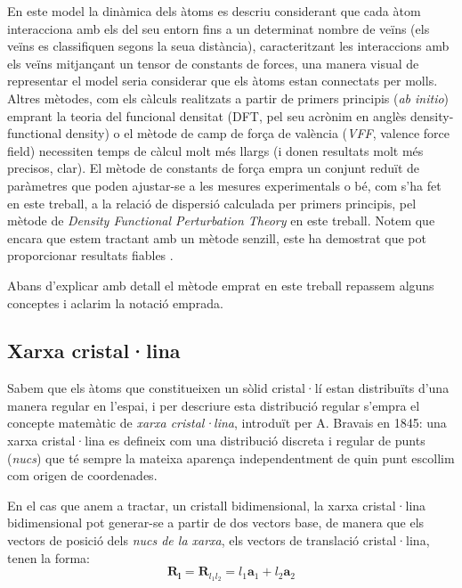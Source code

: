 \documentclass[12pt]{article} %
\let\vec\mathbf %
\begin{document}
En este model la dinàmica dels àtoms es descriu considerant que cada àtom interacciona amb els del seu entorn fins a un determinat nombre de veïns (els veïns es classifiquen segons la seua distància), caracteritzant les interaccions amb els veïns mitjançant un tensor de constants de forces, una manera visual de representar el model seria considerar que els àtoms estan connectats per molls. Altres mètodes, com els càlculs realitzats a partir de primers principis (\emph{ab initio}) emprant la teoria del funcional densitat (DFT, pel seu acrònim en anglès \foreignlanguage{english}{density-functional density}) o el mètode de camp de força de valència (\emph{VFF}, \foreignlanguage{english}{valence force field}) necessiten temps de càlcul molt més llargs (i donen resultats molt més precisos, clar). El mètode de constants de força empra un conjunt reduït de paràmetres que poden ajustar-se a les mesures experimentals o bé, com s'ha fet en este treball, a la relació de dispersió calculada per primers principis, pel mètode de \emph{Density Functional Perturbation Theory} en este treball.  Notem que encara que estem tractant amb un mètode senzill, este ha demostrat que pot proporcionar resultats fiables \cite{wirtz04_phonon_disper_graph_revis}.

Abans d'explicar amb detall el mètode emprat en este treball repassem alguns conceptes i aclarim la notació emprada.

\subsection{Xarxa cristal·lina}

Sabem que els àtoms que constitueixen un sòlid cristal·lí estan distribuïts d'una manera regular en l'espai, i per descriure esta distribució regular s'empra el concepte matemàtic de \emph{xarxa cristal·lina}, introduït per A. Bravais en 1845: una xarxa cristal·lina es defineix com una distribució discreta i regular de punts (\emph{nucs}) que té sempre la mateixa aparença independentment de quin punt escollim com origen de coordenades.

En el cas que anem a tractar, un cristall bidimensional, la xarxa cristal·lina bidimensional pot generar-se a partir de dos vectors base, de manera que els vectors de posició dels \emph{nucs de la xarxa}, els vectors de translació cristal·lina,  tenen la forma:
\begin{equation}
\label{eq:R_l}
 \vec R_\vec l=\vec R_{l_1 l_2}=l_1 \vec a_1 +l_2\vec a_2
\end{equation}
\end{document}
